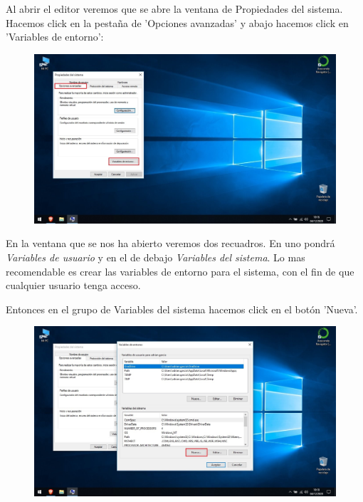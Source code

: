\documentclass[a4paper,10pt]{article}
\begin{document}
\clearpage

Al abrir el editor veremos que se abre la ventana de Propiedades del sistema. Hacemos click en la pestaña de 'Opciones avanzadas' y abajo hacemos click en 'Variables de entorno':

\begin{figure}[H]
\begin{center}
\includegraphics[width=425pt]{./fotos/introduccion/8 - Java (V).jpg}
\end{center}
\end{figure}

En la ventana que se nos ha abierto veremos dos recuadros. En uno pondrá \textit{Variables de usuario} y en el de debajo \textit{Variables del sistema}. Lo mas recomendable es crear las variables de entorno para el sistema, con el fin de que cualquier usuario tenga acceso. 

Entonces en el grupo de Variables del sistema hacemos click en el botón 'Nueva'.

\begin{figure}[H]
\begin{center}
\includegraphics[width=450pt]{./fotos/introduccion/9 - Java (V).jpg}
\end{center}
\end{figure}
\end{document}
